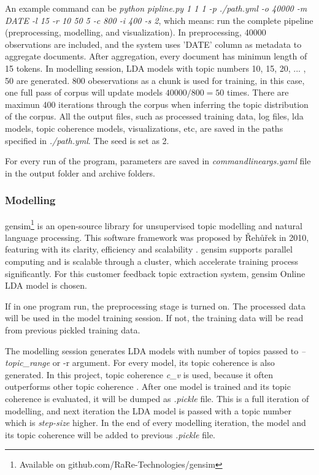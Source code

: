 \documentclass{article} %
\begin{document}
    An example command can be \textit{python pipline.py 1 1 1 -p ./path.yml -o 40000 -m DATE -l 15 -r 10 50 5 -c 800 -i 400 -s 2},
    which means: run the complete pipeline (preprocessing, modelling, and visualization). In preprocessing, 40000 observations are included, and the
    system uses 'DATE' column as metadata to aggregate documents. After aggregation, every document has minimun length of 15 tokens. In modelling session,
    LDA models with topic numbers 10, 15, 20, ... , 50 are generated. 800 obeservations as a chunk is used for training, in this case, one full pass of
    corpus will update models $40000 / 800 = 50$ times. There are maximun 400 iterations through the corpus when inferring the topic distribution of the corpus.
    All the output files, such as processed training data, log files, lda models, topic coherence models, visualizations, etc, are saved in the paths
    specified in \textit{./path.yml}. The seed is set as 2.

    For every run of the program, parameters are saved in \textit{commandline\textunderscore{}args.yaml} file in the output folder and archive folders.

    \subsubsection{Modelling}
    gensim\footnote{Available on github.com/RaRe-Technologies/gensim} is an open-source library for unsupervised topic modelling and natural language processing. This software framework was proposed by {\v R}eh{\r u}{\v r}ek in 2010, featuring with its clarity, efficiency and scalability \cite{rehurek_lrec}. gensim supports parallel computing and is scalable through a cluster, which accelerate training process significantly. For this customer feedback topic extraction system, gensim Online LDA model is chosen.

If in one program run, the preprocessing stage is turned on. The processed data will be used in the model training session. If not, the training data
    will be read from previous pickled training data.

    The modelling session generates LDA models with number of topics passed to \textit{--topic\_range} or {-r} argument. For every model, its topic coherence is also
    generated. In this project, topic coherence \textit{c_v} is used, because it often outperforms other topic coherence \cite{}. After one model is trained and its topic
    coherence is evaluated, it will be dumped as \textit{.pickle} file. This is a full iteration of modelling, and next iteration the LDA model is
    passed with a topic number which is \textit{step-size} higher. In the end of every modelling iteration, the model and its topic coherence will be added
    to previous \textit{.pickle} file.
\end{document}
